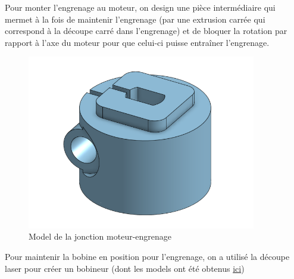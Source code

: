 \documentclass[oneside,a4paper,12pt]{article}
\begin{document}
	Pour monter l'engrenage au moteur, on design une pièce intermédiaire qui mermet à la fois de maintenir l'engrenage (par une extrusion carrée qui correspond à la découpe carré dans l'engrenage) et de bloquer la rotation par rapport à l'axe du moteur pour que celui-ci puisse entraîner l'engrenage.
	
	\begin{figure}[h]
		\centering
		\includegraphics[width=10cm]{motor_holder.png}
		\caption{Model de la jonction moteur-engrenage}
	\end{figure}
	
	Pour maintenir la bobine en position pour l'engrenage, on a utilisé la découpe laser pour créer un bobineur (dont les models ont été obtenus \href{https://cults3d.com/fr/mod%C3%A8le-3d/outil/coudnicolas-4a7a}{ici})
		
	
\end{document}
